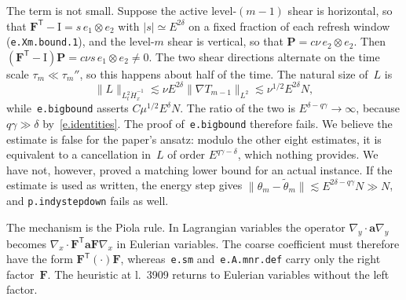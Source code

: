 \documentclass[11pt]{amsart}
\newcommand{\Id}{\mathrm{I}}
\newcommand{\F}{\mathbf{F}}
\renewcommand{\P}{\mathbf{P}}
\newcommand{\Ln}[1]{l.~#1}
\newcommand{\lab}[1]{\texttt{#1}}
\theoremstyle{remark}
\begin{document}
The term is not small. Suppose the active level-$(m-1)$ shear is horizontal, so that $\F^{\mathsf T}-\Id=s\,e_1\otimes e_2$ with $|s|\simeq E^{2\delta}$ on a fixed fraction of each refresh window (\lab{e.Xm.bound.1}), and the level-$m$ shear is vertical, so that $\P=c\nu\,e_2\otimes e_2$. Then $(\F^{\mathsf T}-\Id)\P=c\nu s\,e_1\otimes e_2\neq0$. The two shear directions alternate on the time scale $\tau_m\ll\tau_m''$, so this happens about half of the time. The natural size of~$L$ is
\begin{equation*}
\|L\|_{L^2_t\dot H^{-1}_x}\lesssim\nu E^{2\delta}\|\nabla T_{m-1}\|_{L^2}\lesssim\nu^{1/2}E^{2\delta}N ,
\end{equation*}
while~\lab{e.bigbound} asserts $C\mu^{1/2}E^{\delta}N$. The ratio of the two is $E^{\delta-q\gamma}\to\infty$, because $q\gamma\gg\delta$ by~\eqref{e.identities}. The proof of~\lab{e.bigbound} therefore fails. We believe the estimate is false for the paper's ansatz: modulo the other eight estimates, it is equivalent to a cancellation in~$L$ of order $E^{q\gamma-\delta}$, which nothing provides. We have not, however, proved a matching lower bound for an actual instance. If the estimate is used as written, the energy step gives $\|\theta_m-\widetilde\theta_m\|\lesssim E^{2\delta-q\gamma}N\gg N$, and \lab{p.indystepdown} fails as well.

The mechanism is the Piola rule. In Lagrangian variables the operator $\nabla_y\cdot\mathbf a\nabla_y$ becomes $\nabla_x\cdot\F^{\mathsf T}\mathbf a\F\nabla_x$ in Eulerian variables. The coarse coefficient must therefore have the form $\F^{\mathsf T}(\cdot)\F$, whereas~\lab{e.sm} and~\lab{e.A.mnr.def} carry only the right factor~$\F$. The heuristic at \Ln{3909} returns to Eulerian variables without the left factor.
\end{document}
